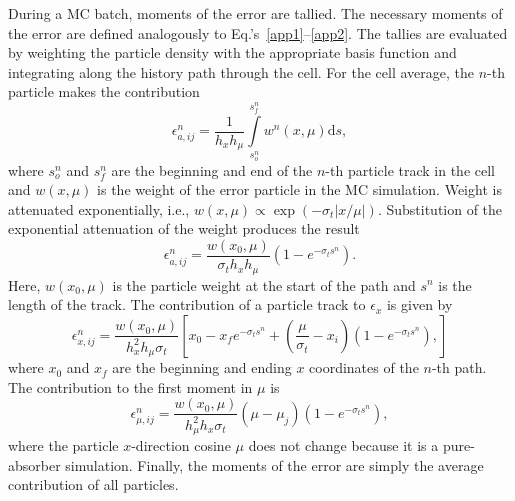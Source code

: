 \documentclass[12pt]{article}
\renewcommand{\d}{\mathrm{d}}
\begin{document}
\begin{center}
During a MC batch, moments of the error are tallied.  The necessary moments of the error are
defined analogously to Eq.'s~\eqref{app1}--\eqref{app2}.
The tallies are evaluated by weighting the particle density with the appropriate
basis function and integrating along the history path through the cell.  For the cell average, the $n$-th
particle makes the contribution
\begin{equation}
    \epsilon^n_{a,ij} = \frac{1}{h_xh_\mu} \int\limits_{s^n_o}^{s^n_f}  w^n(x,\mu) \d s,
\end{equation}
where $s_o^n$ and $s_f^n$ are the beginning and end of the $n$-th particle track in the cell and $w(x,\mu)$ is
the weight of the error particle in the MC simulation.  Weight is attenuated exponentially, i.e., $w(x,\mu)\propto
\exp(-\sigma_t|x/\mu|)$.
Substitution of the exponential attenuation of the weight produces the result
\begin{equation}
    \epsilon^n_{a,ij} = \frac{w(x_0,\mu)}{\sigma_t h_x h_\mu} \left(1 -
    e^{-\sigma_ts^n}\right).
\end{equation}
Here, $w(x_0,\mu)$ is the particle weight at the start of the path and $s^n$ is the
length of the track. The contribution of a
particle track to $\epsilon_x$ is given by
\begin{equation}
    \epsilon^n_{x,ij} = \frac{w(x_0,\mu)}{h_x^2h_\mu \sigma_t} \left[x_0 - x_f e^{-\sigma_t s^n}
        + \left(\frac{\mu}{\sigma_t} - x_i \right)\left(1-e^{-\sigma_t s^n}\right),
    \right]
\end{equation}
where $x_0$ and $x_f$ are the beginning and ending $x$ coordinates of the $n$-th
path.  The contribution to the first moment in $\mu$ is 
\begin{equation}
    \epsilon^n_{\mu,ij} = \frac{w(x_0,\mu)}{h_{\mu}^2h_x\sigma_t}\left(\mu -
    \mu_j\right) \left(1 - e^{-\sigma_ts^n}\right),
\end{equation}
where the particle $x$-direction cosine $\mu$ does not change because it is a pure-absorber simulation.
Finally, the moments of the error are simply the average contribution of all particles.


\end{center}
\end{document}
